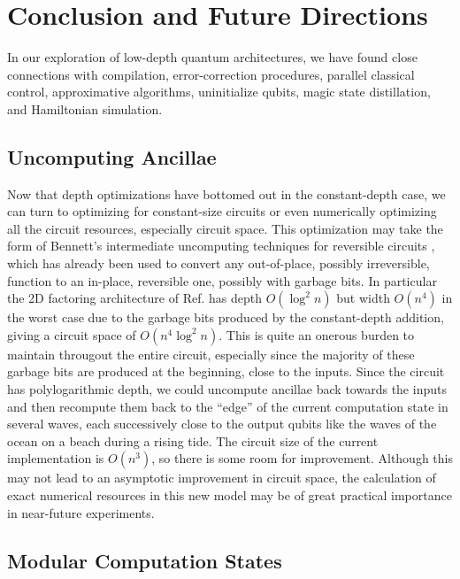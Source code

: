 \section{Conclusion and Future Directions}
\label{sec:conclude}

In our exploration of low-depth quantum architectures, we have found
close connections with compilation,
error-correction procedures, parallel classical
control, approximative algorithms, uninitialize qubits, magic state
distillation, and Hamiltonian simulation.

\subsection{Uncomputing Ancillae}

Now that depth optimizations have bottomed out in the constant-depth case,
we can turn to optimizing for constant-size circuits or even numerically
optimizing all the circuit resources, especially circuit space.
This optimization may take the form of Bennett's intermediate uncomputing
techniques for reversible circuits \cite{Bennett1973},
which has already been used to convert any out-of-place, possibly irreversible,
function to an in-place, reversible one, possibly with garbage bits. In
particular the 2D factoring architecture of Ref. \cite{Pham2012b} has
depth $O(\log^2 n)$ but width $O(n^4)$ in the worst case due to the garbage
bits produced by the constant-depth addition, giving a circuit space of
$O(n^4 \log^2 n)$. This is quite an onerous burden
to maintain througout the entire circuit, especially since the majority of
these garbage bits are produced at the beginning, close to the inputs.
Since the circuit has polylogarithmic depth, we could uncompute ancillae back
towards the inputs and then recompute them back to the ``edge'' of the current computation
state in several waves, each successively close to the output qubits
like the waves of the ocean on a beach during a rising tide.
The circuit size of the current
implementation is $O(n^3)$, so there is some room for improvement.
Although this may not lead to an asymptotic improvement in circuit space,
the calculation of exact numerical resources in this new model may be of
great practical importance in near-future experiments.

\subsection{Modular Computation States}

